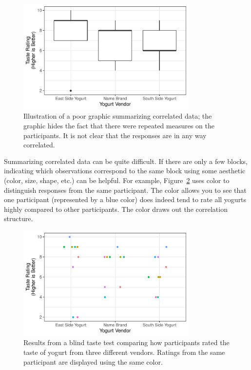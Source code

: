 \documentclass[
  letterpaper,
  DIV=11,
  numbers=noendperiod]{scrreprt}
\theoremstyle{plain}
\theoremstyle{definition}
\theoremstyle{definition}
\theoremstyle{remark}
\begin{document}
\begin{figure}

{\centering \includegraphics[width=0.8\textwidth,height=\textheight]{./images/fig-blocksummaries-bad-plot-1.pdf}

}

\caption{\label{fig-blocksummaries-bad-plot}Illustration of a poor
graphic summarizing correlated data; the graphic hides the fact that
there were repeated measures on the participants. It is not clear that
the responses are in any way correlated.}

\end{figure}

Summarizing correlated data can be quite difficult. If there are only a
few blocks, indicating which observations correspond to the same block
using some aesthetic (color, size, shape, etc.) can be helpful. For
example, Figure~\ref{fig-blocksummaries-color-plot} uses color to
distinguish responses from the same participant. The color allows you to
see that one participant (represented by a blue color) does indeed tend
to rate all yogurts highly compared to other participants. The color
draws out the correlation structure.

\begin{figure}

{\centering \includegraphics[width=0.8\textwidth,height=\textheight]{./images/fig-blocksummaries-color-plot-1.pdf}

}

\caption{\label{fig-blocksummaries-color-plot}Results from a blind taste
test comparing how participants rated the taste of yogurt from three
different vendors. Ratings from the same participant are displayed using
the same color.}

\end{figure}
\end{document}
